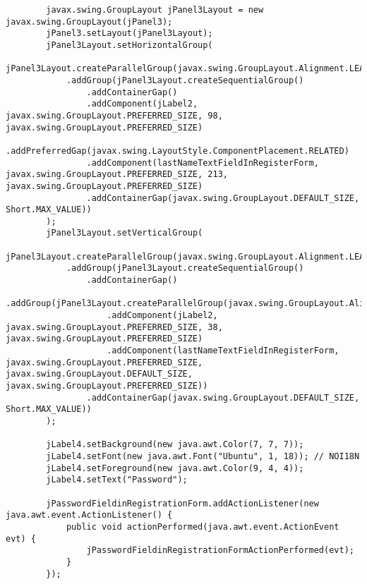 \documentclass[12pt,a4paper]{article}
\begin{document}
\begin{lstlisting}
        javax.swing.GroupLayout jPanel3Layout = new javax.swing.GroupLayout(jPanel3);
        jPanel3.setLayout(jPanel3Layout);
        jPanel3Layout.setHorizontalGroup(
            jPanel3Layout.createParallelGroup(javax.swing.GroupLayout.Alignment.LEADING)
            .addGroup(jPanel3Layout.createSequentialGroup()
                .addContainerGap()
                .addComponent(jLabel2, javax.swing.GroupLayout.PREFERRED_SIZE, 98, javax.swing.GroupLayout.PREFERRED_SIZE)
                .addPreferredGap(javax.swing.LayoutStyle.ComponentPlacement.RELATED)
                .addComponent(lastNameTextFieldInRegisterForm, javax.swing.GroupLayout.PREFERRED_SIZE, 213, javax.swing.GroupLayout.PREFERRED_SIZE)
                .addContainerGap(javax.swing.GroupLayout.DEFAULT_SIZE, Short.MAX_VALUE))
        );
        jPanel3Layout.setVerticalGroup(
            jPanel3Layout.createParallelGroup(javax.swing.GroupLayout.Alignment.LEADING)
            .addGroup(jPanel3Layout.createSequentialGroup()
                .addContainerGap()
                .addGroup(jPanel3Layout.createParallelGroup(javax.swing.GroupLayout.Alignment.BASELINE)
                    .addComponent(jLabel2, javax.swing.GroupLayout.PREFERRED_SIZE, 38, javax.swing.GroupLayout.PREFERRED_SIZE)
                    .addComponent(lastNameTextFieldInRegisterForm, javax.swing.GroupLayout.PREFERRED_SIZE, javax.swing.GroupLayout.DEFAULT_SIZE, javax.swing.GroupLayout.PREFERRED_SIZE))
                .addContainerGap(javax.swing.GroupLayout.DEFAULT_SIZE, Short.MAX_VALUE))
        );

        jLabel4.setBackground(new java.awt.Color(7, 7, 7));
        jLabel4.setFont(new java.awt.Font("Ubuntu", 1, 18)); // NOI18N
        jLabel4.setForeground(new java.awt.Color(9, 4, 4));
        jLabel4.setText("Password");

        jPasswordFieldinRegistrationForm.addActionListener(new java.awt.event.ActionListener() {
            public void actionPerformed(java.awt.event.ActionEvent evt) {
                jPasswordFieldinRegistrationFormActionPerformed(evt);
            }
        });


\end{lstlisting}
\end{document}
